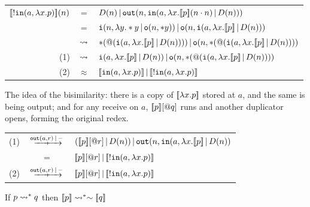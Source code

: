 \documentclass{article}
\begin{document}
\begin{center}
\renewcommand{\arraystretch}{1.2}
    \begin{tabular}{rcl}
         $[\![!\mathtt{in}(a,\lambda x.p)]\!](n)$ & $=$ & $D(n)\,|\, \mathtt{out}(n, \mathtt{in}(a, \lambda x. [\![p]\!](n\cdot n)\,|\, D(n)))$\\
         & $=$ & $\mathtt{i}(n,\lambda y. \ast y\,|\, \mathtt{o}(n,\ast y))\,|\, \mathtt{o}(n,\mathtt{i}(a, \lambda x.[\![p]\!]\,|\, D(n)))$\\
         & $\rightsquigarrow$ & $\ast(@(\mathtt{i}(a,\lambda x.[\![p]\!]\,|\, D(n))))\,|\, \mathtt{o}(n,\ast(@(\mathtt{i}(a,\lambda x. [\![p]\!]\,|\, D(n))))$\\
         (1) & $\rightsquigarrow$ & $\mathtt{i}(a,\lambda x.[\![p]\!]\,|\, D(n))\,|\, \mathtt{o}(n,\ast(@(\mathtt{i}(a,\lambda x. [\![p]\!]\,|\, D(n))))$\\
         (2) & $\approx$ & $[\![\mathtt{in}(a,\lambda x.p)]\!]\,|\, [\![!\mathtt{in}(a,\lambda x.p)]\!]$
    \end{tabular}
\end{center}

The idea of the bisimilarity: there is a copy of $[\![\lambda x.p]\!]$ stored at $a$, and the same is being output; and for any receive on $a$,  $[\![p]\!][@q]$ runs and another duplicator opens, forming the original redex.

\begin{center}
    \renewcommand{\arraystretch}{1.2}
    \begin{tabular}{rcl}
         (1) & $\xr{\mtt{out}(a,r)\pr -}$ & $([\![p]\!][@r]\,|\, D(n))\,|\, \mathtt{out}(n,\mathtt{in}(a,\lambda x.[\![p]\!]\,|\, D(n))$\\
         & $=$ & $[\![p]\!][@r]\,|\, [\![!\mathtt{in}(a,\lambda x.p)]\!]$\\
         (2) & $\xr{\mtt{out}(a,r)\pr -}$ & $[\![p]\!][@r]\,|\, [\![!\mathtt{in}(a,\lambda x.p)]\!]$
    \end{tabular}
\end{center}

\begin{proposition}
    If $p\rightsquigarrow^\ast q$ then $[\![p]\!]\rightsquigarrow^\ast \sim [\![q]\!]$
\end{proposition}
\end{document}
